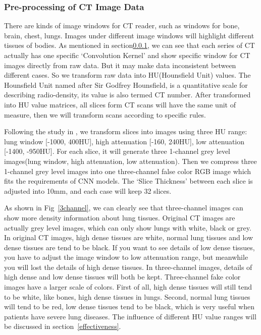 \documentclass[journal]{IEEEtran}
\begin{document}
\subsubsection{Pre-processing of CT Image Data}
\label{ctimagedata}
There are kinds of image windows for CT reader, such as windows for bone, brain, chest, lungs. Images under different image windows will highlight different tissues of bodies.
As mentioned in section\ref{ctimagedata}, we can see that each series of CT actually has one specific `Convolution Kernel' and show specific window for CT images directly from raw data. But it may make data inconsistent between different cases. So we transform raw data into HU(Hounsfield Unit) values. The Hounsfield Unit named after Sir Godfrey Hounsfield, is a quantitative scale for describing radio-density, its value is also termed CT number. After transformed into HU value matrices, all slices form CT scans will have the same unit of measure, then we will transform scans according to specific rules.

Following the study in \cite{Shin2017Three} \cite{gao2018holistic}, we transform slices into images using three HU range: lung window [-1000, 400HU], high attenuation [-160, 240HU], low attenuation [-1400, -950HU]. 
For each slice, it will generate three 1-channel grey level images(lung window, high attenuation, low attenuation). Then we compress three 1-channel grey level images into one three-channel false color RGB image which fits the requirements of CNN models. The `Slice Thickness' between each slice is adjusted into 10mm, and each case will keep 32 slices.

As shown in Fig~\ref{3channel}, we can clearly see that three-channel images can show more density information about lung tissues. Original CT images are actually grey level images, which can only show lungs with white, black or grey. In original CT images, high dense tissues are white, normal lung tissues and low dense tissues are tend to be black. If you want to see details of low dense tissues, you have to adjust the image window to low attenuation range, but meanwhile you will lost the details of high dense tissues. 
In three-channel images, details of high dense and low dense tissues will both be kept. Three-channel fake color images have a larger scale of colors. First of all, high dense tissues will still tend to be white, like bones, high dense tissues in lungs. Second, normal lung tissues will tend to be red, low dense tissues tend to be black, which is very useful when patients have severe lung diseases.
The influence of different HU value ranges will be discussed in section~\ref{effectiveness}.
\end{document}
